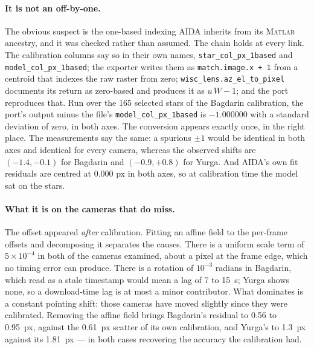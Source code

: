 \documentclass[11pt,a4paper]{article}
\begin{document}
\paragraph{It is not an off-by-one.} The obvious suspect is the one-based
indexing AIDA inherits from its \textsc{Matlab} ancestry, and it was checked
rather than assumed. The chain holds at every link. The calibration columns say
so in their own names, \texttt{star\_col\_px\_1based} and
\texttt{model\_col\_px\_1based}; the exporter writes them as
\texttt{match.image.x + 1} from a centroid that indexes the raw raster from
zero; \texttt{wisc\_lens.az\_el\_to\_pixel} documents its return as zero-based
and produces it as $u\,W-1$; and the port reproduces that. Run over the 165
selected stars of the Bagdarin calibration, the port's output minus the file's
\texttt{model\_col\_px\_1based} is $-1.000000$ with a standard deviation of
zero, in both axes. The conversion appears exactly once, in the right place.
The measurements say the same: a spurious $\pm1$ would be identical in both
axes and identical for every camera, whereas the observed shifts are
$(-1.4,-0.1)$ for Bagdarin and $(-0.9,+0.8)$ for Yurga. And AIDA's own fit
residuals are centred at $0.000$ px in both axes, so at calibration time the
model sat on the stars.

\paragraph{What it is on the cameras that do miss.} The offset appeared
\emph{after} calibration. Fitting an affine field to the per-frame offsets and
decomposing it separates the causes. There is a uniform scale term of
$5\times10^{-4}$ in both of the cameras examined, about a pixel at the frame
edge, which no timing error can produce. There is a rotation of $10^{-3}$
radians in Bagdarin, which read as a stale timestamp would mean a lag of 7 to
\SI{15}{\second}; Yurga shows none, so a download-time lag is at most a minor
contributor. What dominates is a constant pointing shift: those cameras have
moved slightly since they were calibrated. Removing the affine field brings
Bagdarin's residual to \num{0.56} to \SI{0.95}{px}, against the \SI{0.61}{px}
scatter of its own calibration, and Yurga's to \SI{1.3}{px} against its
\SI{1.81}{px} --- in both cases recovering the accuracy the calibration had.
\end{document}
